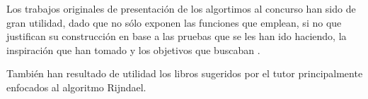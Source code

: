 Los trabajos originales de presentación de los algortimos al concurso han sido de gran utilidad, dado que no sólo exponen las funciones que emplean, si no que justifican su construcción en base a las pruebas que se les han ido haciendo, la inspiración que han tomado y los objetivos que buscaban \cite{Rijndael_design, Serpent_AES, MARS_AES, TwoFish_AES, RC6_AES}.

También han resultado de utilidad los libros \cite{Crypto_Bases, Crypto_Bases2} sugeridos por el tutor principalmente enfocados al algoritmo Rijndael.
